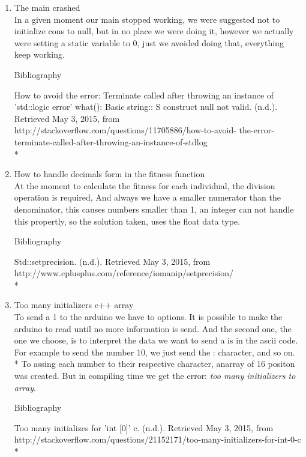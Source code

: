 \documentclass[twocolumn]{IEEEtran}
\begin{document}
\begin{enumerate}
    
	\item The main crashed\\
    In a given moment our main stopped working, we were suggested not to initialize cons 
    to null, but in no place we were doing it, however we actually were setting a static 
    variable to 0, just we avoided doing that, everything keep working.
    
    \begin{center}
    Bibliography
    \end{center}
    How to avoid the error: Terminate called after throwing an instance of 
    'std::logic error' what(): Basic string:: S construct null not valid. (n.d.). 
    Retrieved May 3, 2015, from http://stackoverflow.com/questions/11705886/how-to-avoid-
    the-error-terminate-called-after-throwing-an-instance-of-stdlog\\*


	\item How to handle decimals form in the fitness function\\
    	At the moment to calculate the fitness for each individual, the division 
        operation is required, And always we have a smaller numerator than the 
        denominator, this causes numbers smaller than 1, an integer can not handle this 
        propertly, so the solution taken, uses the float data type.
    \begin{center}
    Bibliography
    \end{center}
    Std::setprecision. (n.d.). Retrieved May 3, 2015, from 
    http://www.cplusplus.com/reference/iomanip/setprecision/\\*
	
    \item Too many initializers c++ array \\
    	To send a 1 to the arduino we have to options. It is possible to make the arduino 
        to read until no more information is send. And the second one, the one we choose, 
        is to interpret the data we want to send a is in the ascii code. For example to 
        send the number 10, we just send the : character, and so on.\\*
        To assing each number to their respective character, anarray of 16 positon was
        created. But in compiling time we get the error: \textit{too many initializers 
        to array}. 
        
    \begin{center}
    Bibliography
    \end{center}
    Too many initializes for 'int [0]' c. (n.d.). Retrieved May 3, 2015, from 
    http://stackoverflow.com/questions/21152171/too-many-initializers-for-int-0-c\\*


\end{enumerate}
\end{document}
